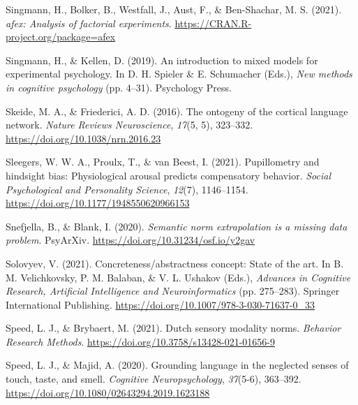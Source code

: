 \documentclass[
  12pt,
  man,floatsintext]{apa7}
\newlength{\cslhangindent}
\newlength{\cslentryspacingunit} %
\newenvironment{CSLReferences}[2] %
 {%
  \setlength{\parindent}{0pt}
  \ifodd #1
  \let\oldpar\par
  \def\par{\hangindent=\cslhangindent\oldpar}
  \fi
  \setlength{\parskip}{#2\cslentryspacingunit}
 }%
 {}
\begin{document}
\begin{CSLReferences}{1}{0}
\leavevmode{}%
Singmann, H., Bolker, B., Westfall, J., Aust, F., \& Ben-Shachar, M. S. (2021). \emph{{afex}: Analysis of factorial experiments}. \url{https://CRAN.R-project.org/package=afex}

\leavevmode{}%
Singmann, H., \& Kellen, D. (2019). An introduction to mixed models for experimental psychology. In D. H. Spieler \& E. Schumacher (Eds.), \emph{New methods in cognitive psychology} (pp. 4--31). {Psychology Press}.

\leavevmode{}%
Skeide, M. A., \& Friederici, A. D. (2016). The ontogeny of the cortical language network. \emph{Nature Reviews Neuroscience}, \emph{17}(5, 5), 323--332. \url{https://doi.org/10.1038/nrn.2016.23}

\leavevmode{}%
Sleegers, W. W. A., Proulx, T., \& van Beest, I. (2021). Pupillometry and hindsight bias: Physiological arousal predicts compensatory behavior. \emph{Social Psychological and Personality Science}, \emph{12}(7), 1146--1154. \url{https://doi.org/10.1177/1948550620966153}

\leavevmode{}%
Snefjella, B., \& Blank, I. (2020). \emph{Semantic norm extrapolation is a missing data problem}. {PsyArXiv}. \url{https://doi.org/10.31234/osf.io/y2gav}

\leavevmode{}%
Solovyev, V. (2021). Concreteness/abstractness concept: State of the art. In B. M. Velichkovsky, P. M. Balaban, \& V. L. Ushakov (Eds.), \emph{Advances in {Cognitive Research}, {Artificial Intelligence} and {Neuroinformatics}} (pp. 275--283). {Springer International Publishing}. \url{https://doi.org/10.1007/978-3-030-71637-0_33}

\leavevmode{}%
Speed, L. J., \& Brybaert, M. (2021). Dutch sensory modality norms. \emph{Behavior Research Methods}. \url{https://doi.org/10.3758/s13428-021-01656-9}

\leavevmode{}%
Speed, L. J., \& Majid, A. (2020). Grounding language in the neglected senses of touch, taste, and smell. \emph{Cognitive Neuropsychology}, \emph{37}(5-6), 363--392. \url{https://doi.org/10.1080/02643294.2019.1623188}


\end{CSLReferences}
\end{document}
